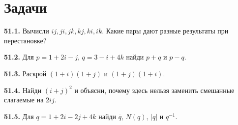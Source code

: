 \section*{Задачи}
\begingroup\setlength{\parskip}{2pt}
\noindent\begin{minipage}[t]{\linewidth}\textbf{51.1.} Вычисли \(ij,ji,jk,kj,ki,ik\). Какие пары дают разные результаты при перестановке?\par\end{minipage}\par
\noindent\begin{minipage}[t]{\linewidth}\textbf{51.2.} Для \(p=1+2i-j\), \(q=3-i+4k\) найди \(p+q\) и \(p-q\).\par\end{minipage}\par
\noindent\begin{minipage}[t]{\linewidth}\textbf{51.3.} Раскрой \((1+i)(1+j)\) и \((1+j)(1+i)\).\par\end{minipage}\par
\noindent\begin{minipage}[t]{\linewidth}\textbf{51.4.} Найди \((i+j)^2\) и объясни, почему здесь нельзя заменить смешанные слагаемые на \(2ij\).\par\end{minipage}\par
\noindent\begin{minipage}[t]{\linewidth}\textbf{51.5.} Для \(q=1+2i-2j+4k\) найди \(\overline q\), \(N(q)\), \(|q|\) и \(q^{-1}\).\par\end{minipage}\par
